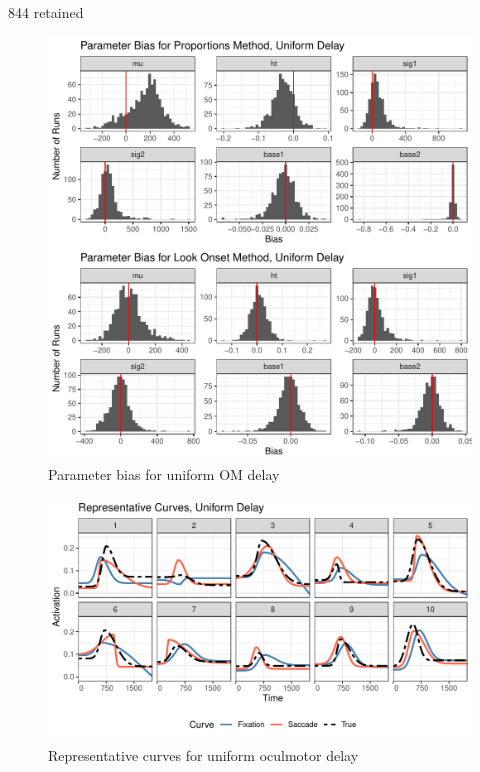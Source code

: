 \documentclass{article}
\begin{document}
844 retained


\begin{figure}[H]
\centering
\includegraphics{dg_uniform_delay_par_bias.pdf}
\caption{Parameter bias for uniform OM delay}
\label{fig:par_bias_uniform_delay}
\end{figure}

\begin{figure}[H]
\centering
\includegraphics{dg_rep_curves_uniform_delay.pdf}
\caption{Representative curves for uniform oculmotor delay}
\label{fig:rep_curves_uniform_delay}
\end{figure}
\end{document}
